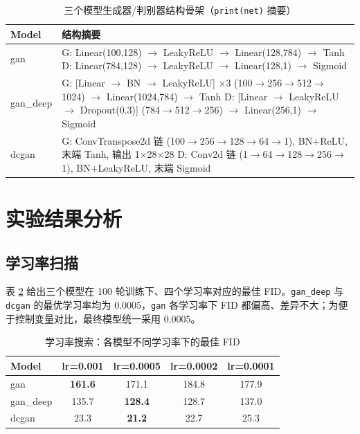 \documentclass[a4paper]{article}
\begin{document}
\begin{table}[htbp]
\centering
\caption{三个模型生成器/判别器结构骨架（\texttt{print(net)} 摘要）}
\scriptsize
\setlength{\tabcolsep}{4pt}
\begin{tabular}{p{} p{}}
\toprule
Model & \ttfamily 结构摘要 \\
\midrule
gan &
\parbox[t]{0.81\textwidth}{\ttfamily
G: Linear(100,128) $\rightarrow$ LeakyReLU $\rightarrow$ Linear(128,784) $\rightarrow$ Tanh \\
D: Linear(784,128) $\rightarrow$ LeakyReLU $\rightarrow$ Linear(128,1) $\rightarrow$ Sigmoid}
\\[2mm]
gan\_deep &
\parbox[t]{0.81\textwidth}{\ttfamily
G: [Linear $\rightarrow$ BN $\rightarrow$ LeakyReLU] $\times$3 (100$\to$256$\to$512$\to$1024) $\rightarrow$ Linear(1024,784) $\rightarrow$ Tanh \\
D: [Linear $\rightarrow$ LeakyReLU $\rightarrow$ Dropout(0.3)] (784$\to$512$\to$256) $\rightarrow$ Linear(256,1) $\rightarrow$ Sigmoid}
\\[2mm]
dcgan &
\parbox[t]{0.81\textwidth}{\ttfamily
G: ConvTranspose2d 链 (100$\to$256$\to$128$\to$64$\to$1), BN+ReLU, 末端 Tanh, 输出 1$\times$28$\times$28 \\
D: Conv2d 链 (1$\to$64$\to$128$\to$256$\to$1), BN+LeakyReLU, 末端 Sigmoid}
\\
\bottomrule
\end{tabular}
\label{tab:model_prints}
\end{table}

\section{实验结果分析}
\subsection{学习率扫描}
表 \ref{tab:lr_sweep} 给出三个模型在 100 轮训练下、四个学习率对应的最佳 FID。\texttt{gan\_deep} 与 \texttt{dcgan} 的最优学习率均为 $0.0005$，\texttt{gan} 各学习率下 FID 都偏高、差异不大；为便于控制变量对比，最终模型统一采用 $0.0005$。

\begin{table}[H]
\centering
\caption{学习率搜索：各模型不同学习率下的最佳 FID}
\begin{tabular}{lcccc}
\toprule
Model & lr=0.001 & lr=0.0005 & lr=0.0002 & lr=0.0001 \\
\midrule
gan      & \textbf{161.6} & 171.1 & 184.8 & 177.9 \\
gan\_deep & 135.7 & \textbf{128.4} & 128.7 & 137.0 \\
dcgan    & 23.3 & \textbf{21.2} & 22.7 & 25.3 \\
\bottomrule
\end{tabular}
\label{tab:lr_sweep}
\end{table}
\end{document}
